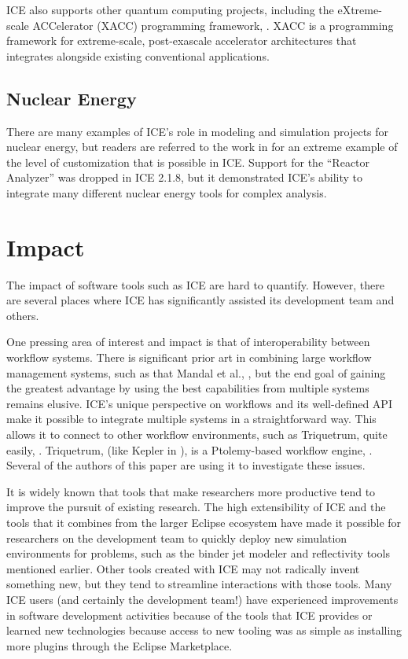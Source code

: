 ICE also supports other quantum computing projects, including the
eXtreme-scale ACCelerator (XACC) programming framework,
\cite{mccaskey_ornl-qci/xacc_2016}. XACC is a programming framework for
extreme-scale, post-exascale accelerator architectures that integrates
alongside existing conventional applications.

\subsection{Nuclear Energy}\label{nuclear-energy}

There are many examples of ICE's role in modeling and simulation
projects for nuclear energy, but readers are referred to the work in
\cite{billings_domain-specific_2015} for an extreme example of the level of
customization that is possible in ICE. Support for the ``Reactor
Analyzer'' was dropped in ICE 2.1.8, but it demonstrated ICE's ability
to integrate many different nuclear energy tools for complex analysis.

\section{Impact}\label{impact}

The impact of software tools such as ICE are hard to quantify. However,
there are several places where ICE has significantly assisted its
development team and others.

One pressing area of interest and impact is that of interoperability
between workflow systems. There is significant prior art in combining
large workflow management systems, such as that Mandal et al.,
\cite{mandal_integrating_2007}, but the end goal of gaining the greatest
advantage by using the best capabilities from multiple systems remains elusive.
ICE's unique perspective on workflows and its well-defined API make it
possible to integrate multiple systems in a straightforward way. This
allows it to connect to other workflow environments, such as Triquetrum,
quite easily, \cite{brooks_introducing_2016}. Triquetrum, (like Kepler in
\cite{mandal_integrating_2007}), is a Ptolemy-based workflow engine,
\cite{brooks_triquetrum:_2015}. Several of the authors of this paper are using
it to investigate these issues.

It is widely known that tools that make researchers more productive tend
to improve the pursuit of existing research. The high extensibility of
ICE and the tools that it combines from the larger Eclipse ecosystem
have made it possible for researchers on the development team to quickly
deploy new simulation environments for problems, such as the binder jet
modeler and reflectivity tools mentioned earlier. Other tools created
with ICE may not radically invent something new, but they tend to
streamline interactions with those tools. Many ICE users (and certainly
the development team!) have experienced improvements in software
development activities because of the tools that ICE provides or learned
new technologies because access to new tooling was as simple as
installing more plugins through the Eclipse Marketplace.

